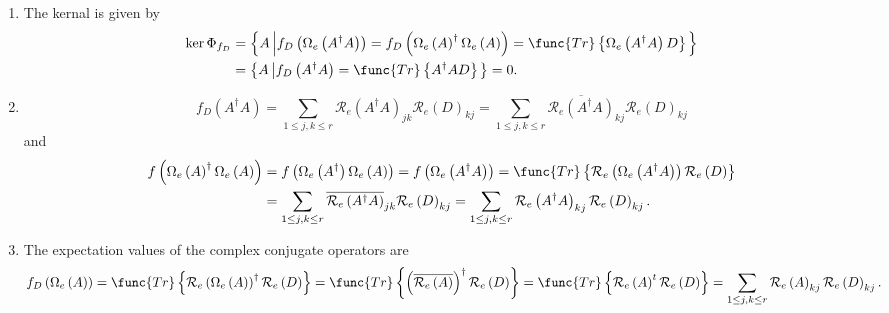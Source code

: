 \documentclass[aps,preprint]{revtex4}
\begin{document}
\begin{enumerate}
\item The kernal is given by 
\begin{align}
\ker\Phi_{f_{D}} & =\left\{ A\left\vert f_{D}\left( \Omega_{e}\left(
A^{\dagger}A\right) \right) =f_{D}\left( \Omega_{e}\left( A\right)
^{\dagger}\Omega_{e}\left( A\right) \right) =\func{Tr}\left\{
\Omega_{e}\left( A^{\dagger}A\right) D\right\} \right. \right\} \\
& =\left\{ A\left\vert f_{D}\left( A^{\dagger}A\right) =\func{Tr}\left\{
A^{\dagger}AD\right\} \right. \right\} =0.
\end{align}

\item 
\begin{equation}
f_{D}\left( A^{\dagger}A\right) =\sum_{1\leq j,k\leq r}\mathcal{R}_{e}\left(
A^{\dagger}A\right) _{jk}\mathcal{R}_{e}\left( D\right) _{kj}=\sum_{1\leq
j,k\leq r}\overline{\mathcal{R}_{e}\left( A^{\dagger }A\right) }_{kj}%
\mathcal{R}_{e}\left( D\right) _{kj}
\end{equation}
and%
\begin{align}
f\left( \Omega_{e}\left( A\right) ^{\dagger}\Omega_{e}\left( A\right)
\right) & =f\left( \Omega_{e}\left( A^{\dagger}\right) \Omega_{e}\left(
A\right) \right) =f\left( \Omega_{e}\left( A^{\dagger}A\right) \right) =%
\func{Tr}\left\{ \mathcal{R}_{e}\left( \Omega_{e}\left( A^{\dagger}A\right)
\right) \mathcal{R}_{e}\left( D\right) \right\} \\
& =\sum_{1\leq j,k\leq r}\overline{\mathcal{R}_{e}\left( A^{\dagger
}A\right) }_{jk}\mathcal{R}_{e}\left( D\right) _{kj}=\sum_{1\leq j,k\leq r}%
\mathcal{R}_{e}\left( A^{\dagger}A\right) _{kj}\mathcal{R}_{e}\left(
D\right) _{kj}.
\end{align}

\item The expectation values of the complex conjugate operators are 
\begin{equation}
f_{D}\left( \Omega_{e}\left( A\right) \right) =\func{Tr}\left\{ \mathcal{R}%
_{e}\left( \Omega_{e}\left( A\right) \right) ^{\dagger }\mathcal{R}%
_{e}\left( D\right) \right\} =\func{Tr}\left\{ \left( \overline{\mathcal{R}%
_{e}\left( A\right) }\right) ^{\dagger}\mathcal{R}_{e}\left( D\right)
\right\} =\func{Tr}\left\{ \mathcal{R}_{e}\left( A\right) ^{t}\mathcal{R}%
_{e}\left( D\right) \right\} =\sum_{1\leq j,k\leq r}\mathcal{R}_{e}\left(
A\right) _{kj}\mathcal{R}_{e}\left( D\right) _{kj}.
\end{equation}


\end{enumerate}
\end{document}
